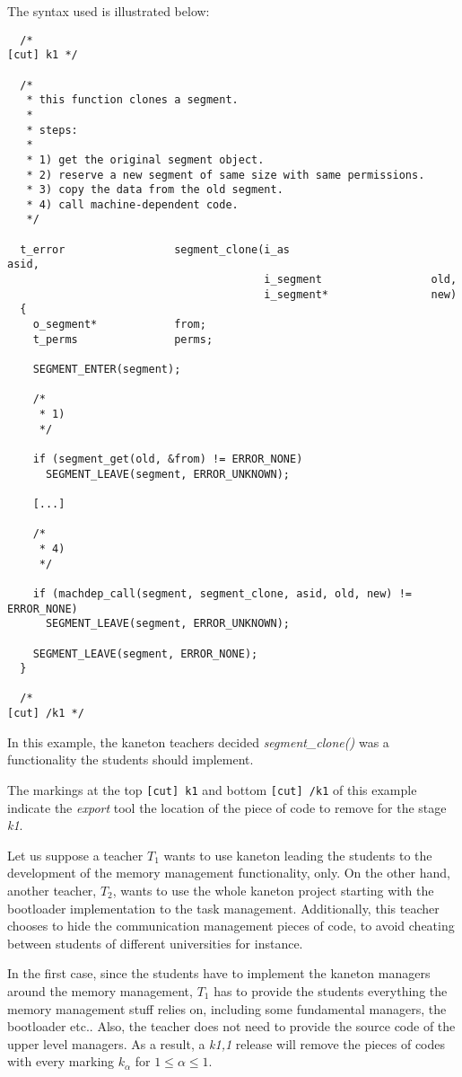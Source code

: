 The syntax used is illustrated below:

\begin{verbatim}
  /*                                                                [cut] k1 */

  /*
   * this function clones a segment.
   *
   * steps:
   *
   * 1) get the original segment object.
   * 2) reserve a new segment of same size with same permissions.
   * 3) copy the data from the old segment.
   * 4) call machine-dependent code.
   */

  t_error                 segment_clone(i_as                      asid,
                                        i_segment                 old,
                                        i_segment*                new)
  {
    o_segment*            from;
    t_perms               perms;

    SEGMENT_ENTER(segment);

    /*
     * 1)
     */

    if (segment_get(old, &from) != ERROR_NONE)
      SEGMENT_LEAVE(segment, ERROR_UNKNOWN);

    [...]

    /*
     * 4)
     */

    if (machdep_call(segment, segment_clone, asid, old, new) != ERROR_NONE)
      SEGMENT_LEAVE(segment, ERROR_UNKNOWN);

    SEGMENT_LEAVE(segment, ERROR_NONE);
  }

  /*                                                               [cut] /k1 */
\end{verbatim}

In this example, the kaneton teachers decided \textit{segment\_clone()}
was a functionality the students should implement.

The markings at the top \verb|[cut] k1| and bottom \verb|[cut] /k1| of this
example indicate the \textit{export} tool the location of the piece of code
to remove for the stage \textit{k1}.

Let us suppose a teacher $T_{1}$ wants to use kaneton leading the students to
the development of the memory management functionality, only. On the other
hand, another teacher, $T_{2}$, wants to use the whole kaneton project starting
with the bootloader implementation to the task management. Additionally,
this teacher chooses to hide the communication management pieces of code,
to avoid cheating between students of different universities for instance.

In the first case, since the students have to implement the kaneton managers
around the memory management, $T_{1}$ has to provide the students everything
the memory management stuff relies on, including some fundamental managers,
the bootloader etc.. Also, the teacher does not need to provide the source
code of the upper level managers. As a result, a \textit{k1,1} release will
remove the pieces of codes with every marking $k_{\alpha}$ for
$1 \le \alpha \le 1$.

